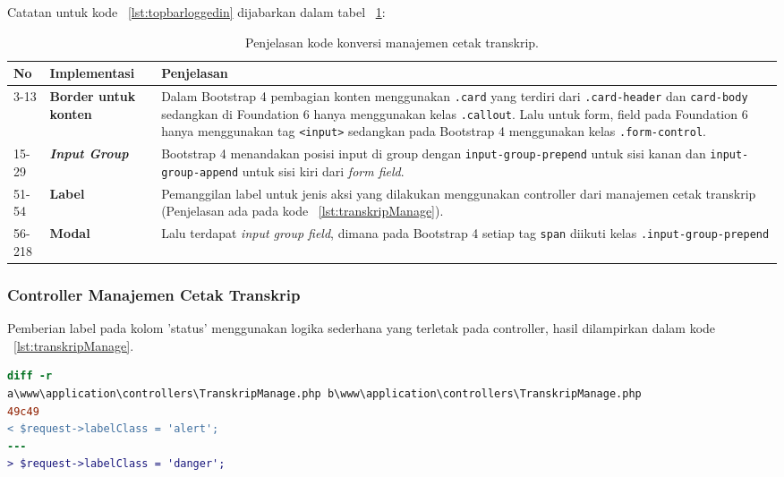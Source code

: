 \noindent Catatan untuk kode ~\ref{lst:topbarloggedin} dijabarkan dalam tabel ~\ref{tabel:KodeManajemenCetakTranskrip}:
\begin{table}[H]
	\centering
	\caption{Penjelasan kode konversi manajemen cetak transkrip.}
	\begin{tabularx}{\textwidth}{llX}
		\toprule
		No & Implementasi     & Penjelasan \\
		\midrule
		3-13 & \textbf{Border untuk konten} & Dalam Bootstrap 4 pembagian konten menggunakan \texttt{.card} yang terdiri dari \texttt{.card-header} dan \texttt{card-body} sedangkan di Foundation 6 hanya menggunakan kelas \texttt{.callout}. Lalu untuk form, field pada Foundation 6 hanya menggunakan tag \texttt{<input>} sedangkan pada Bootstrap 4 menggunakan kelas \texttt{.form-control}.\\
		15-29 & \textbf{\textit{Input Group}} & Bootstrap 4 menandakan posisi input di group dengan \texttt{input-group-prepend} untuk sisi kanan dan \texttt{input-group-append} untuk sisi kiri dari \textit{form field}.\\
		51-54 & \textbf{Label}  & Pemanggilan label untuk jenis aksi yang dilakukan menggunakan controller dari manajemen cetak transkrip (Penjelasan ada pada kode ~\ref{lst:transkripManage}).\\
		56-218 & \textbf{Modal}  & Lalu terdapat \textit{input group field}, dimana pada Bootstrap 4 setiap tag \texttt{span} diikuti kelas \texttt{.input-group-prepend}\\
		\bottomrule
	\end{tabularx}%
	\label{tabel:KodeManajemenCetakTranskrip}
\end{table}

\subsubsection{Controller Manajemen Cetak Transkrip}
Pemberian label pada kolom 'status' menggunakan logika sederhana yang terletak pada controller, hasil dilampirkan dalam kode ~\ref{lst:transkripManage}.
\begin{lstlisting}[language=diff, caption=Controller Manajemen Cetak Transkrip,  basicstyle=\ttfamily, frame=single,
columns=fullflexible, keepspaces=true, breaklines=true, label={lst:transkripManage}]
diff -r 
a\www\application\controllers\TranskripManage.php b\www\application\controllers\TranskripManage.php
49c49
< $request->labelClass = 'alert';
---
> $request->labelClass = 'danger';

\end{lstlisting}

